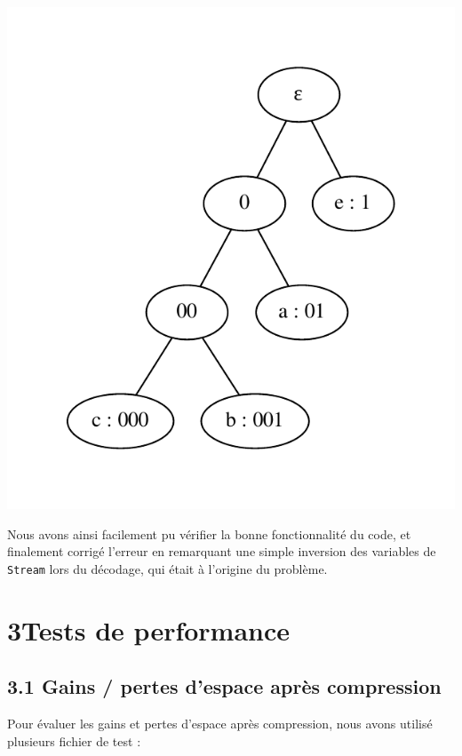 \documentclass [a4paper,11pt] {report}
\begin{document}
\begin{center}
  \includegraphics[scale=0.75]{test1.pdf}
\end{center}

Nous avons ainsi facilement pu vérifier la bonne fonctionnalité du code, et finalement corrigé l'erreur en remarquant une simple inversion des variables de \lstinline!Stream! lors du décodage, qui était à l'origine du problème.


\section* {3\hspace{5mm}Tests de performance }

\subsection* {3.1\hspace{3mm} Gains / pertes d'espace après compression}

Pour évaluer les gains et pertes d'espace après compression, nous avons utilisé plusieurs fichier de test :
\end{document}
